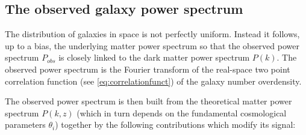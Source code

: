  

\subsection{The observed galaxy power spectrum \label{sub:observed-powerspectrum}}

The distribution of galaxies in space is not perfectly uniform. Instead it follows, up to a bias, the underlying
matter power spectrum so that the observed power spectrum $P_{obs}$ 
is closely linked to the dark matter power spectrum $P(k)$. The observed
power spectrum is the Fourier transform of the real-space two point correlation
function (see \cref{eq:correlationfunct}) of the galaxy number overdensity.

The observed power spectrum is then built from the theoretical matter power spectrum
$P(k,z)$ (which in turn depends on the fundamental cosmological parameters
$\theta_{i}$) together by the following contributions which modify its signal:

